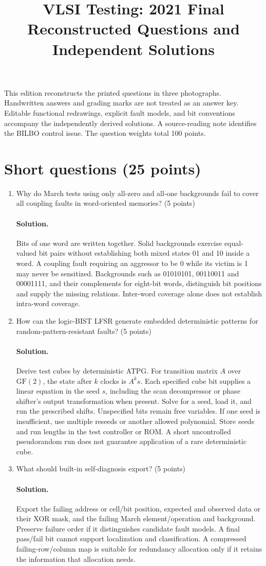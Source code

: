 \documentclass[11pt,a4paper]{article}
\title{VLSI Testing: 2021 Final\\Reconstructed Questions and Independent Solutions}
\author{}\date{}
\newcommand{\sol}{\paragraph{Solution.}}
\begin{document}
\maketitle
This edition reconstructs the printed questions in three photographs. Handwritten answers and grading marks are not treated as an answer key. Editable functional redrawings, explicit fault models, and bit conventions accompany the independently derived solutions. A source-reading note identifies the BILBO control issue. The question weights total 100 points.

\section{Short questions (25 points)}
\begin{enumerate}[label=(\alph*)]
\item Why do March tests using only all-zero and all-one backgrounds fail to cover all coupling faults in word-oriented memories? (5 points)
\sol Bits of one word are written together. Solid backgrounds exercise equal-valued bit pairs without establishing both mixed states 01 and 10 inside a word. A coupling fault requiring an aggressor to be 0 while its victim is 1 may never be sensitized. Backgrounds such as 01010101, 00110011 and 00001111, and their complements for eight-bit words, distinguish bit positions and supply the missing relations. Inter-word coverage alone does not establish intra-word coverage.

\item How can the logic-BIST LFSR generate embedded deterministic patterns for random-pattern-resistant faults? (5 points)
\sol Derive test cubes by deterministic ATPG. For transition matrix $A$ over $\mathrm{GF}(2)$, the state after $k$ clocks is $A^ks$. Each specified cube bit supplies a linear equation in the seed $s$, including the scan decompressor or phase shifter's output transformation when present. Solve for a seed, load it, and run the prescribed shifts. Unspecified bits remain free variables. If one seed is insufficient, use multiple reseeds or another allowed polynomial. Store seeds and run lengths in the test controller or ROM. A short uncontrolled pseudorandom run does not guarantee application of a rare deterministic cube.

\item What should built-in self-diagnosis export? (5 points)
\sol Export the failing address or cell/bit position, expected and observed data or their XOR mask, and the failing March element/operation and background. Preserve failure order if it distinguishes candidate fault models. A final pass/fail bit cannot support localization and classification. A compressed failing-row/column map is suitable for redundancy allocation only if it retains the information that allocation needs.


\end{enumerate}
\end{document}
